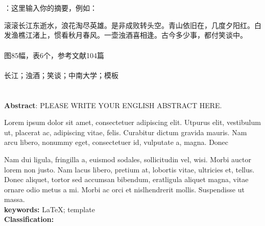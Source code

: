 \newpage
\fancyhead[L,C,R]{}
\renewcommand{\headrule}{\color{lightgray}\hrule width\headwidth height0.0pt}
\chapter*{\mytitle}

\setlength{\baselineskip}{20pt}

：这里输入你的摘要，例如：

滚滚长江东逝水，浪花淘尽英雄。是非成败转头空。青山依旧在，几度夕阳红。白发渔樵江渚上，惯看秋月春风。一壶浊酒喜相逢。古今多少事，都付笑谈中。\\
\\
图85幅，表6个，参考文献104篇\\\\
 长江；浊酒；笑谈；中南大学；\LaTeXe 模板\\
 \zhongtu


\vspace*{1ex}
\chapter*{\myEnlishTitle}

\setlength{\baselineskip}{20pt}
\noindent\textbf{Abstract}: PLEASE WRITE YOUR ENGLISH ABSTRACT HERE.

Lorem ipsum dolor sit amet, consectetuer adipiscing elit. Utpurus elit, vestibulum ut, placerat ac, adipiscing vitae, felis. Curabitur	dictum gravida mauris. Nam arcu libero, nonummy eget, consectetuer id,	vulputate a, magna. Donec

Nam dui ligula, fringilla a, euismod sodales, sollicitudin vel, wisi. Morbi auctor lorem non justo. Nam lacus libero, pretium at, lobortis vi­tae, ultricies et, tellus. Donec aliquet, tortor sed accumsan bibendum, eratligula aliquet magna, vitae ornare odio metus a mi. Morbi ac orci et nislhendrerit mollis. Suspendisse ut massa.\\

\noindent\textbf{keywords:} \LaTeX; template\\
\noindent\textbf{Classification:} \zhongtu



